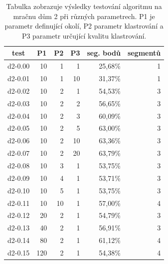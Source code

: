 \documentclass[11pt,twoside,a4paper]{book}
\begin{document}
\begin{table}[H]
\begin{center}
\begin{tabular}{|r|r|r|r|r|r|}
\hline
\multicolumn{1}{|c|}{test} & \multicolumn{1}{c|}{P1} & \multicolumn{1}{c|}{P2} & \multicolumn{1}{c|}{P3} & \multicolumn{1}{c|}{seg. bodů} & \multicolumn{1}{c|}{segmentů} \\ \hline
d2-0.00 & 10 & 1 & 1 & 25,68\% & 1 \\ \hline
d2-0.01 & 10 & 1 & 10 & 31,37\% & 1 \\ \hline
d2-0.02 & 10 & 2 & 1 & 54,53\% & 3 \\ \hline
d2-0.03 & 10 & 2 & 2 & 56,65\% & 3 \\ \hline
d2-0.04 & 10 & 2 & 3 & 60,09\% & 3 \\ \hline
d2-0.05 & 10 & 2 & 5 & 63,00\% & 3 \\ \hline
d2-0.06 & 10 & 2 & 10 & 63,36\% & 3 \\ \hline
d2-0.07 & 10 & 2 & 20 & 63,79\% & 3 \\ \hline
d2-0.08 & 10 & 3 & 1 & 53,75\% & 3 \\ \hline
d2-0.09 & 10 & 4 & 1 & 53,71\% & 3 \\ \hline
d2-0.10 & 10 & 5 & 1 & 53,75\% & 3 \\ \hline
d2-0.11 & 10 & 10 & 1 & 57,00\% & 4 \\ \hline
d2-0.12 & 20 & 2 & 1 & 54,79\% & 3 \\ \hline
d2-0.13 & 40 & 2 & 1 & 56,91\% & 3 \\ \hline
d2-0.14 & 80 & 2 & 1 & 61,12\% & 4 \\ \hline
d2-0.15 & 120 & 2 & 1 & 54,38\% & 4 \\ \hline
\end{tabular}
\caption{Tabulka zobrazuje výsledky testování algoritmu na mračnu dům 2 při různých parametrech. P1 je parametr definující okolí, P2 parametr klastrování a P3 parametr určující kvalitu klastrování.} 
\label{table:test2-param-d2}
\end{center}
\end{table}
\end{document}
